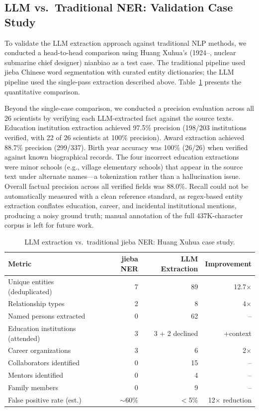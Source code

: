 \documentclass[review]{elsarticle}
\begin{document}
\subsection{LLM vs.\ Traditional NER: Validation Case Study}
\label{sec:precision}

To validate the LLM extraction approach against traditional NLP methods, we conducted a head-to-head comparison using Huang Xuhua's (1924--, nuclear submarine chief designer) nianbiao as a test case. The traditional pipeline used jieba Chinese word segmentation with curated entity dictionaries; the LLM pipeline used the single-pass extraction described above. Table~\ref{tab:llm_vs_ner} presents the quantitative comparison.

Beyond the single-case comparison, we conducted a precision evaluation across all 26 scientists by verifying each LLM-extracted fact against the source texts. Education institution extraction achieved 97.5\% precision (198/203 institutions verified, with 22 of 26 scientists at 100\% precision). Award extraction achieved 88.7\% precision (299/337). Birth year accuracy was 100\% (26/26) when verified against known biographical records. The four incorrect education extractions were minor schools (e.g., village elementary schools) that appear in the source text under alternate names—a tokenization rather than a hallucination issue. Overall factual precision across all verified fields was 88.0\%. Recall could not be automatically measured with a clean reference standard, as regex-based entity extraction conflates education, career, and incidental institutional mentions, producing a noisy ground truth; manual annotation of the full 437K-character corpus is left for future work.

\begin{table}[ht]
\centering
\caption{LLM extraction vs.\ traditional jieba NER: Huang Xuhua case study.}
\label{tab:llm_vs_ner}
\begin{tabular}{lrrr}
\toprule
Metric & jieba NER & LLM Extraction & Improvement \\
\midrule
Unique entities (deduplicated) & 7 & 89 & 12.7$\times$ \\
Relationship types & 2 & 8 & 4$\times$ \\
Named persons extracted & 0 & 62 & -- \\
Education institutions (attended) & 3 & 3 + 2 declined & +context \\
Career organizations & 3 & 6 & 2$\times$ \\
Collaborators identified & 0 & 15 & -- \\
Mentors identified & 0 & 4 & -- \\
Family members & 0 & 9 & -- \\
False positive rate (est.) & $\sim$60\% & $<$5\% & 12$\times$ reduction \\
\bottomrule
\end{tabular}
\end{table}
\end{document}
